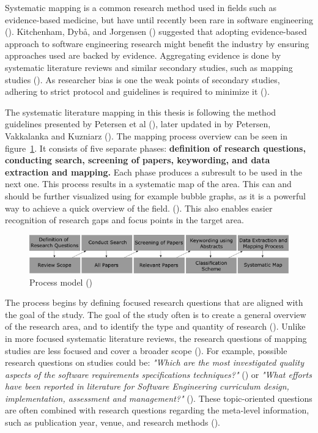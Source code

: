 \documentclass[utf8,english]{gradu3}
\begin{document}
Systematic mapping is a common research method used in fields such as
evidence-based medicine, but have until recently been rare in software
engineering (\cite{petersen2008}). Kitchenham, Dybå, and Jorgensen
(\cite*{kitchenham2004}) suggested that adopting evidence-based approach to
software engineering research might benefit the industry by ensuring approaches
used are backed by evidence. Aggregating evidence is done by systematic
literature reviews and similar secondary studies, such as mapping studies
(\cite{kitchenham2010}). As researcher bias is one the weak points of secondary
studies, adhering to strict protocol and guidelines is required to minimize it
(\cite{brereton2007}).


The systematic literature mapping in this thesis is following the method
guidelines presented by Petersen et al (\cite*{petersen2008}), later updated in
by Petersen, Vakkalanka and Kuzniarz (\cite*{petersen2015}). The mapping process
overview can be seen in figure~\ref{fig:mapping}. It consists of five separate
phases: \textbf{definition of research questions, conducting search, screening
of papers, keywording, and data extraction and mapping.} Each phase produces a
subresult to be used in the next one. This process results in a systematic map
of the area. This can and should be further visualized using for example bubble
graphs, as it is a powerful way to achieve a quick overview of the field.
(\cite{petersen2008}). This also enables easier recognition of research gaps and
focus points in the target area.


\begin{figure}[h]
  \includegraphics[width=\linewidth]{images/method_graph_L.png}
  \caption{Process model (\cite{petersen2008})}
  \label{fig:mapping}
\end{figure}

The process begins by defining focused research questions that are aligned with
the goal of the study. The goal of the study often is to create a general
overview of the research area, and to identify the type and quantity of research
(\cite{petersen2008}). Unlike in more focused systematic literature reviews, the
research questions of mapping studies are less focused and cover a broader scope
(\cite{kitchenham2010}). For example, possible research questions on studies
could be: \emph{"Which are the most investigated quality aspects of the software
requirements specifications techniques?"} (\cite{condori2009}) or \emph{"What
efforts have been reported in literature for Software Engineering curriculum
design, implementation, assessment and management?"} (\cite{qadir2011}). These
topic-oriented questions are often combined with research questions regarding
the meta-level information, such as publication year, venue, and research
methods (\cite{petersen2015}).
\end{document}
